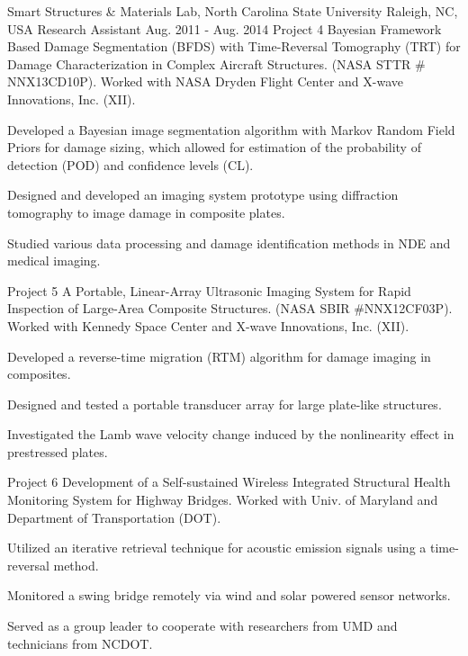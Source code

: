 \begin{cventries}
  \cventryprojtrueb
    {Smart Structures \& Materials Lab, North Carolina State University} %
    {Raleigh, NC, USA} %
    {Research Assistant} %
    {Aug. 2011 - Aug. 2014} %
    {Project 4} %
    {{Bayesian Framework Based Damage Segmentation (BFDS) with Time-Reversal Tomography (TRT) for Damage Characterization in Complex Aircraft Structures.} (NASA STTR \# NNX13CD10P). Worked with NASA Dryden Flight Center and X-wave Innovations, Inc. (XII).}
    {     
     \begin{cvitems} %
       \item {Developed a Bayesian image segmentation algorithm with Markov Random Field Priors for damage sizing, which allowed for estimation of the probability of detection (POD) and confidence levels (CL).}
       \item {Designed and developed an imaging system prototype using diffraction tomography to image damage in composite plates.}
       \item {Studied various data processing and damage identification methods in NDE and medical imaging.}
      \end{cvitems}
         }
  \cventryprojtruec
    {Project 5} %
   {{A Portable, Linear-Array Ultrasonic Imaging System for Rapid Inspection of Large-Area Composite Structures.} (NASA SBIR \#NNX12CF03P). Worked with Kennedy Space Center and X-wave Innovations, Inc. (XII).}
    {     
     \begin{cvitems} %
       \item {Developed a reverse-time migration (RTM) algorithm for damage imaging in composites. }
       \item {Designed and tested a portable transducer array for large plate-like structures.}
       \item {Investigated the Lamb wave velocity change induced by the nonlinearity effect in prestressed plates.}
      \end{cvitems}
         }
  \cventryprojtruec
    {Project 6} %
   {{Development of a Self-sustained Wireless Integrated Structural Health Monitoring System for Highway Bridges.} Worked with Univ. of Maryland and Department of Transportation (DOT). }
    {     
     \begin{cvitems} %
       \item {Utilized an iterative retrieval technique for acoustic emission signals using a time-reversal method.}
       \item {Monitored a swing bridge remotely via wind and solar powered sensor networks.}
       \item {Served as a group leader to cooperate with researchers from UMD and technicians from NCDOT.}
      \end{cvitems}
         }



\end{cventries}
